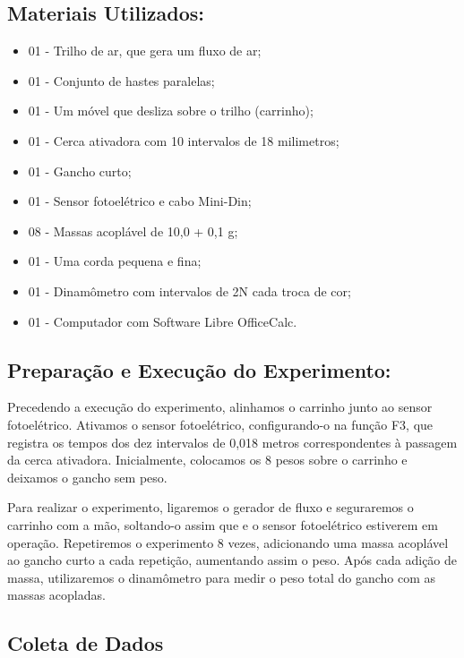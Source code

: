 \documentclass[article,12pt,oneside,a4paper,brazil]{abntex2}
\begin{document}
	\subsection{Materiais Utilizados:}
	\begin{adjustwidth}{1cm}{0cm}
		\begin{itemize}
			\item 01 - Trilho de ar, que gera um fluxo de ar;
			\item 01 - Conjunto de hastes paralelas;
			\item 01 - Um móvel que desliza sobre o trilho (carrinho);
			\item 01 - Cerca ativadora com 10 intervalos de 18 milimetros;
			\item 01 - Gancho curto;
			\item 01 - Sensor fotoelétrico e cabo Mini-Din;
			\item 08 - Massas acoplável de 10,0 + 0,1 g;
			\item 01 - Uma corda pequena e fina;
			\item 01 - Dinamômetro com intervalos de 2N cada troca de cor;	
			\item 01 - Computador com Software Libre OfficeCalc.
		\end{itemize}
	\end{adjustwidth}
	
	\subsection{Preparação e Execução do Experimento:}
	
	Precedendo a execução do experimento, alinhamos o carrinho junto ao sensor
	fotoelétrico. Ativamos o sensor fotoelétrico, configurando-o na função F3, que registra os tempos dos dez intervalos de 0,018 metros correspondentes à passagem da cerca ativadora. Inicialmente, colocamos os 8 pesos sobre o carrinho e deixamos o gancho sem peso.
	
	Para realizar o experimento, ligaremos o gerador de fluxo e seguraremos o carrinho com a mão, soltando-o assim que e o sensor fotoelétrico estiverem em operação. Repetiremos o experimento 8 vezes, adicionando uma massa acoplável ao gancho curto a cada repetição, aumentando assim o peso. Após cada adição de massa, utilizaremos o dinamômetro para medir o peso total do gancho com as massas acopladas.
	
	\subsection{Coleta de Dados}
	
\end{document}
